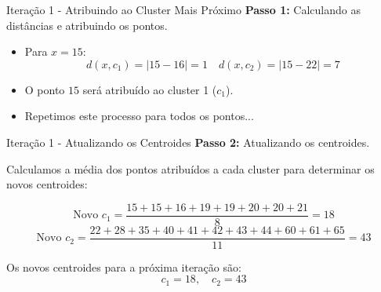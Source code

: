\documentclass{beamer}
\begin{document}
\begin{frame}{Iteração 1 - Atribuindo ao Cluster Mais Próximo}
    \textbf{Passo 1:} Calculando as distâncias e atribuindo os pontos.

    \begin{itemize}
        \item Para \(x = 15\):
        \[
        d(x, c_1) = |15 - 16| = 1 \quad d(x, c_2) = |15 - 22| = 7
        \]
        \item O ponto \(15\) será atribuído ao cluster 1 (\(c_1\)).
    \end{itemize}

    \begin{itemize}
        \item Repetimos este processo para todos os pontos...
    \end{itemize}

\end{frame}


\begin{frame}{Iteração 1 - Atualizando os Centroides}
    \textbf{Passo 2:} Atualizando os centroides.

    Calculamos a média dos pontos atribuídos a cada cluster para determinar os novos centroides:

    \[
    \text{Novo } c_1 = \frac{15 + 15 + 16 + 19 + 19 + 20 + 20 + 21}{8} = 18
    \]
    \[
    \text{Novo } c_2 = \frac{22 + 28 + 35 + 40 + 41 + 42 + 43 + 44 + 60 + 61 + 65}{11} = 43
    \]

    Os novos centroides para a próxima iteração são:
    \[
    c_1 = 18, \quad c_2 = 43
    \]
\end{frame}
\end{document}
